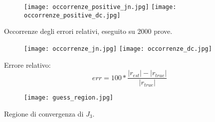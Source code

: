 \documentclass{beamer}
\begin{document}
\begin{frame}
\begin{figure}
\texttt{[image: occorrenze\_positive\_jn.jpg]} 
\texttt{[image: occorrenze\_positive\_dc.jpg]}
\end{figure}
Occorrenze degli errori relativi, eseguito su 2000 prove.
\end{frame}
\begin{frame}[plain]
\begin{figure} 
\centering
\texttt{[image: occorrenze\_jn.jpg]} 
\texttt{[image: occorrenze\_dc.jpg]} \\
\end{figure}
Errore relativo: \begin{equation}
err=100*\frac{|r_{est}|-|r_{true}|}{|r_{true}|}
\end{equation}
\end{frame}
\begin{frame}[plain]
\begin{figure}
\centering
\texttt{[image: guess\_region.jpg]}
\end{figure}
Regione di convergenza di $J_3$.
\end{frame}
\end{document}
